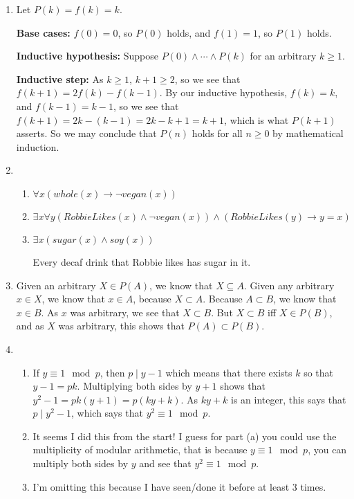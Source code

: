 \documentclass[12pt]{article}
\theoremstyle{definition}
\theoremstyle{remark}
\newcommand{\ra}{\rightarrow}
\begin{document}
\begin{enumerate}
		\item Let $P(k) = f(k) = k$. 
		
		\textbf{Base cases: } $f(0) = 0$, so $P(0)$ holds, and $f(1) = 1$, so $P(1)$ holds.
		
		\textbf{Inductive hypothesis: } Suppose $P(0) \land \cdots \land P(k)$ for an arbitrary $k \geq 1$.
		
		\textbf{Inductive step: }
		As $k \geq 1$, $k + 1 \geq 2$, so we see that $f(k+1) = 2f(k)-f(k-1)$. By our inductive hypothesis, $f(k) = k$, and $f(k-1)=k-1$, so we see that $f(k+1)=2k-(k-1)=2k-k+1=k+1$, which is what $P(k+1)$ asserts. So we may conclude that $P(n)$ holds for all $n \geq 0$ by mathematical induction.
		
		\item 
		\begin{enumerate}
			\item 
			$\forall x (whole(x) \ra \lnot vegan(x))$
			\item $\exists x \forall y (RobbieLikes(x) \land \lnot vegan(x)) \land (RobbieLikes(y) \ra y = x)$
			\item $\exists x (sugar(x) \land soy(x))$
			
			Every decaf drink that Robbie likes has sugar in it.
		\end{enumerate}
		\item Given an arbitrary $X \in P(A)$, we know that $X \subseteq A$. Given any arbitrary $x \in X$, we know that $x \in A$, because $X \subset A$. Because $A \subset B$, we know that $x \in B$. As $x$ was arbitrary, we see that $X \subset B$. But $X \subset B$ iff $X \in P(B)$, and as $X$ was arbitrary, this shows that $P(A) \subset P(B)$.
		
		\item 
			\begin{enumerate}
				\item 
				If $y \equiv 1\mod p$, then $p \mid y - 1$ which means that there exists $k$ so that $y-1 = pk$. Multiplying both sides by $y+1$ shows that $y^2-1 = pk(y+1) = p(ky+k)$. As $ky+k$ is an integer, this says that $p \mid y^2-1$, which says that $y^2 \equiv 1 \mod p$.
				\item It seems I did this from the start! I guess for part (a) you could use the multiplicity of modular arithmetic, that is because $y \equiv 1 \mod p$, you can multiply both sides by $y$ and see that $y^2 \equiv 1 \mod p$.
				\item I'm omitting this because I have seen/done it before at least 3 times.
			\end{enumerate}
		

\end{enumerate}
\end{document}
